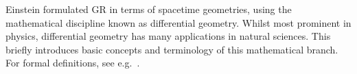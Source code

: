 





\newcommand\Chr{\ChristoffelSym}
\newcommand*\Kd{\Krondelta}
\newcommand*\Ric{\RicciScalar}
\newcommand\cfac{\Upsilon}
\newcommand\wt{\widetilde}
\newcommand\hypacc{\ALIAShypacc}













Einstein formulated GR in terms of spacetime geometries, using the mathematical discipline known as differential geometry. 
Whilst most prominent in physics, differential geometry has many applications in natural sciences. This~ briefly introduces basic concepts and terminology of this mathematical branch. For formal definitions, see e.g.~\citet[~2 \&~3]{carrollSpacetimeGeometryIntroduction2019}.


